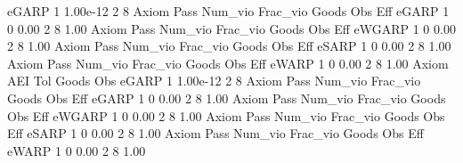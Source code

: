        eGARP {\VBAR}         1   1.00e-12          2          8 
{\smallskip}
{\smallskip}
{\smallskip}
       Axiom {\VBAR} Pass     Num_vio    Frac_vio       Goods         Obs         Eff  
       eGARP {\VBAR}    1           0        0.00           2           8        1.00  
{\smallskip}
{\smallskip}
{\smallskip}
       Axiom {\VBAR} Pass     Num_vio    Frac_vio       Goods         Obs         Eff  
      eWGARP {\VBAR}    1           0        0.00           2           8        1.00  
{\smallskip}
{\smallskip}
{\smallskip}
       Axiom {\VBAR} Pass     Num_vio    Frac_vio       Goods         Obs         Eff  
       eSARP {\VBAR}    1           0        0.00           2           8        1.00  
{\smallskip}
{\smallskip}
{\smallskip}
       Axiom {\VBAR} Pass     Num_vio    Frac_vio       Goods         Obs         Eff  
       eWARP {\VBAR}    1           0        0.00           2           8        1.00  
{\smallskip}
       Axiom {\VBAR}       AEI        Tol      Goods        Obs 
       eGARP {\VBAR}         1   1.00e-12          2          8 
{\smallskip}
{\smallskip}
{\smallskip}
       Axiom {\VBAR} Pass     Num_vio    Frac_vio       Goods         Obs         Eff  
       eGARP {\VBAR}    1           0        0.00           2           8        1.00  
{\smallskip}
{\smallskip}
{\smallskip}
       Axiom {\VBAR} Pass     Num_vio    Frac_vio       Goods         Obs         Eff  
      eWGARP {\VBAR}    1           0        0.00           2           8        1.00  
{\smallskip}
{\smallskip}
{\smallskip}
       Axiom {\VBAR} Pass     Num_vio    Frac_vio       Goods         Obs         Eff  
       eSARP {\VBAR}    1           0        0.00           2           8        1.00  
{\smallskip}
{\smallskip}
{\smallskip}
       Axiom {\VBAR} Pass     Num_vio    Frac_vio       Goods         Obs         Eff  
       eWARP {\VBAR}    1           0        0.00           2           8        1.00  
